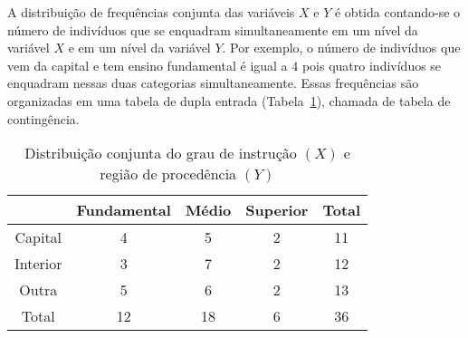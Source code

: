 \documentclass[11pt,fleqn]{book} %
\begin{document}
\begin{example}
A distribuição de frequências conjunta das variáveis $X$ e $Y$ é obtida contando-se o número de indivíduos que se enquadram simultaneamente em um nível da variável $X$ e em um nível da variável $Y$. Por exemplo, o número de indivíduos que vem da capital e tem ensino fundamental é igual a $4$ pois quatro indivíduos se enquadram nessas duas categorias simultaneamente. Essas frequências são organizadas em uma tabela de dupla entrada (Tabela~\ref{tab:distconjinstrucaoprocedencia1}), chamada de tabela de contingência. \\



\begin{table}[h]
	\vspace{0,3cm}
	\caption{Distribuição conjunta do grau de instrução $(X)$ e região de procedência $(Y)$}
	\label{tab:distconjinstrucaoprocedencia1} 
	\vspace{-0.1cm}
	\centering
	\begin{tabular}{c | c c c | c}
	\toprule
	\backslashbox{$\bm Y$}{$\bm X$} & \textbf{Fundamental} & \textbf{Médio} & \textbf{Superior} & \textbf{Total} \\
	\midrule
	Capital & 4 & 5 & 2 & 11 \\
	Interior & 3 & 7 & 2 & 12 \\
	Outra & 5 & 6 & 2 & 13 \\
	\midrule
	Total & 12 & 18 & 6 & 36 \\
	\bottomrule
	\end{tabular} \\
\end{table}


\end{example}
\end{document}
